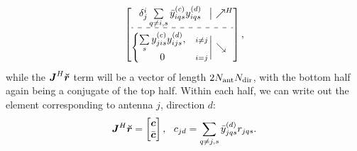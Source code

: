 \documentclass[useAMS,usenatbib]{mn2e}
\makeatletter
\newcommand{\mat}[1]{{\bmath{#1}}}
\newcommand{\JJ}{\mat{J}} %
\newcommand{\MM}{\mat{M}}
\newcommand{\VV}{\mat{V}}
\newcommand{\GG}{\mat{G}}
\newcommand{\Matrix}[2]{\left [ \begin{array}{@{}#1@{}}#2\end{array} \right ]}
\newcommand{\AUGx}[1]{\mathbf{\breve{#1}}}
\newcommand{\AUG}[1]{\bmath{\breve{#1}}}
\newcommand{\Rr}{\AUG{r}}
\newcommand{\GGg}{\AUGx{G}}
\newcommand{\TOP}{\mathrm{U}}%
\newcommand{\Rop}[1]{\mathcal{R}_{{#1}}}
\newcommand{\Lop}[1]{\mathcal{L}_{{#1}}}
\numberwithin{equation}{section}
\providecommand{\DIFaddbegin}{} %
\providecommand{\DIFdelend}{} %
\makeatother
\begin{document}
\begin{equation}%
\DIFdelend \DIFaddbegin \JHJblocks{
  \delta^i_j \sum\limits_{q\ne i,s} \yycH_{iqs} \yyd_{iqs} 
}{
  \left \{ 
  \begin{array}{@{}cc@{}}
   \sum\limits_{s} \yyc_{jis} \yyd_{ijs},&{\scriptstyle i\ne j} \\
   0 &{\scriptstyle i=j}
  \end{array} \right . 
},
\label{eq:JHJ:DD:unpol}
\end{equation}
while the $\JJ^H\Rr$ term will be a vector of length $2N_\mathrm{ant}N_\mathrm{dir}$, with the bottom half again being
a conjugate of the top half. Within each half, we can write out the element corresponding to 
antenna $j$, direction $d$: 
\begin{equation}
\label{eq:JHR:DD:unpol}
\JJ^H\Rr = \Matrix{c}{\bmath{c}\\\bar{\bmath{c}}},~~c_{jd} = \sum\limits_{q\ne j,s} 
\yydH_{jqs} r_{jqs}.
\end{equation}
\end{document}
